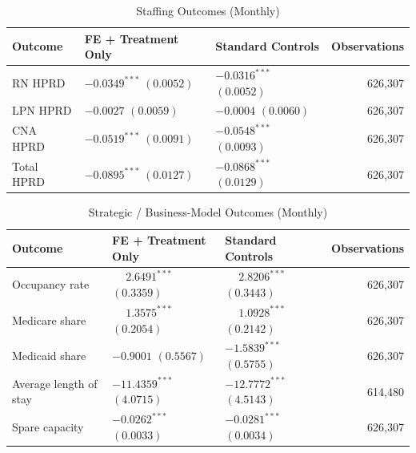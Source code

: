 \documentclass[12pt]{article}
\begin{document}
\begin{table}[H]
\centering
\caption{Staffing Outcomes (Monthly)}
\label{tab:fe-only-staffing}
\small
\setlength{\tabcolsep}{6pt}
\begin{tabularx}{\textwidth}{@{} l Y Y r @{}}
\toprule
Outcome & FE + Treatment Only & Standard Controls & Observations \\
\midrule
RN HPRD &  &  & 626,307 \\
LPN HPRD &  &  & 626,307 \\
CNA HPRD &  &  & 626,307 \\
Total HPRD &  &  & 626,307 \\
\bottomrule
\end{tabularx}
\end{table}

\begin{table}[H]
\centering
\caption{Strategic / Business-Model Outcomes (Monthly)}
\label{tab:fe-only-strategic}
\small
\setlength{\tabcolsep}{6pt}
\begin{tabularx}{\textwidth}{@{} l Y Y r @{}}
\toprule
Outcome & FE + Treatment Only & Standard Controls & Observations \\
\midrule
Occupancy rate &  &  & 626,307 \\
Medicare share &  &  & 626,307 \\
Medicaid share &  &  & 626,307 \\
Average length of stay &  &  & 614,480 \\
Spare capacity &  &  & 626,307 \\
\bottomrule
\end{tabularx}
\end{table}
\end{document}
